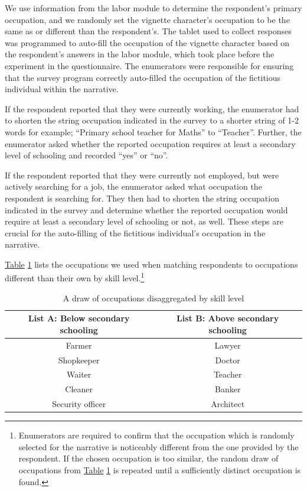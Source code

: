 \documentclass[a4paper,12pt]{article}
\begin{document}
\begin{appendix}
We use information from the labor module to determine the respondent's primary occupation, and we randomly set the vignette character's occupation to be the same as or different than the respondent's. The tablet used to collect responses was programmed to auto-fill the occupation of the vignette character based on the respondent's answers in the labor module, which took place before the experiment in the questionnaire. The enumerators were responsible for ensuring that the survey program correctly auto-filled the occupation of the fictitious individual within the narrative. 

If the respondent reported that they were currently working, the enumerator had to shorten the string occupation indicated in the survey to a shorter string of 1-2 words for example; ``Primary school teacher for Maths'' to ``Teacher''. Further, the enumerator asked whether the reported occupation requires at least a secondary level of schooling and recorded ``yes'' or ``no''.

If the respondent reported that they were currently not employed, but were actively searching for a job, the enumerator asked what occupation the respondent is searching for. They then had to shorten the string occupation indicated in the survey and determine whether the reported occupation would require at least a secondary level of schooling or not, as well. These steps are crucial for the auto-filling of the fictitious individual's occupation in the narrative. 

\hyperref[tab:occupationskills]{Table} \ref{tab:occupationskills} lists the occupations we used when matching respondents to occupations different than their own by skill level.\footnote{Enumerators are required to confirm that the occupation which is randomly selected for the narrative is noticeably different from the one provided by the respondent. If the chosen occupation is too similar, the random draw of occupations from \hyperref[tab:occupationskills]{Table} \ref{tab:occupationskills} is repeated until a sufficiently distinct occupation is found.}  

\bigskip
\bigskip

    \begin{table}[H]
        \begin{center}
        \caption{A draw of occupations disaggregated by skill level}
        \label{tab:occupationskills}
            \begin{tabular}{c|c}
                List A: Below secondary schooling & List B: Above secondary schooling \\
                \hline \hline
                Farmer & Lawyer \\
                Shopkeeper & Doctor \\
                Waiter & Teacher \\
                Cleaner & Banker \\
                Security officer & Architect \\
            \end{tabular}
        \end{center}
    \end{table}


\end{appendix}
\end{document}

